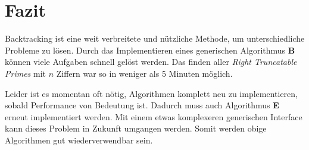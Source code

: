 \chapter*{Fazit}
Backtracking ist eine weit verbreitete und nützliche Methode,
um unterschiedliche Probleme zu lösen. Durch das Implementieren eines generischen Algorithmus \textbf{B}
können viele Aufgaben schnell gelöst werden. Das finden aller \textit{Right Truncatable Primes} mit $n$ Ziffern\cite[src/primes.rs]{Kauschke}
war so in weniger als 5 Minuten möglich. 

Leider ist es momentan oft nötig, Algorithmen komplett neu zu implementieren, sobald Performance von Bedeutung ist.
Dadurch muss auch Algorithmus \textbf{E} erneut implementiert werden. Mit einem etwas komplexeren generischen Interface kann dieses Problem in
Zukunft umgangen werden. Somit werden obige Algorithmen gut wiederverwendbar sein.